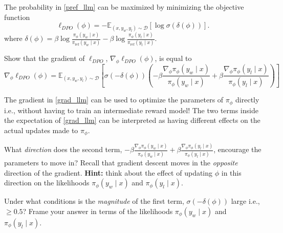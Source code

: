 \documentclass[11pt,addpoints,answers]{exam}
\begin{document}
\begin{questions}
\begin{parts}
\begin{subparts}
\clearpage
    \subpart[3] The probability in \eqref{pref_llm} can be maximized by minimizing the objective function
    \begin{equation}
        \ell_{DPO}(\phi) = -\mathbb{E}_{(x,y_w,y_l)\sim\mathcal{D}}\left[\log \sigma\left(\delta(\phi)\right) \right].
        \label{obj_llm}
    \end{equation}
    where $\delta(\phi) = \beta \log \frac{\pi_{\phi}(y_w \mid x)}{\pi_{\textrm{ref}}(y_w \mid x)} - \beta \log \frac{\pi_{\phi}(y_l \mid x)}{\pi_{\textrm{ref}}(y_l \mid x)}$. 

    Show that the gradient of $\ell_{DPO}$, $\nabla_{\phi} \ell_{DPO}(\phi)$, is equal to
    \begin{equation}
        \nabla_{\phi}\ell_{DPO}(\phi) = \mathbb{E}_{(x,y_w,y_l)\sim\mathcal{D}}\left[\sigma\left(-\delta(\phi)\right)\left(- \beta \frac{\nabla_{\phi}\pi_{\phi}(y_w \mid x)}{\pi_{\phi}(y_w \mid x)} + \beta  \frac{\nabla_{\phi}\pi_{\phi}(y_l \mid x)}{\pi_{\phi}(y_l \mid x)}\right) \right]
        \label{grad_llm}
    \end{equation}
    \begin{answer_box}[title=,height=12cm, width=14.5cm]
    \end{answer_box}

\clearpage
    \subpart The gradient in \eqref{grad_llm} can be used to optimize the parameters of $\pi_{\phi}$ directly i.e., without having to train an intermediate reward model! The two terms inside the expectation of \eqref{grad_llm} can be interpreted as having different effects on the actual updates made to $\pi_{\phi}$. 

    \begin{subsubparts}
        \subsubpart[2] What \emph{direction} does the second term, $- \beta \frac{\nabla_{\phi}\pi_{\phi}(y_w \mid x)}{\pi_{\phi}(y_w \mid x)} + \beta  \frac{\nabla_{\phi}\pi_{\phi}(y_l \mid x)}{\pi_{\phi}(y_l \mid x)}$, encourage the parameters to move in? Recall that gradient descent moves in the \emph{opposite} direction of the gradient. \textbf{Hint:} think about the effect of updating $\phi$ in this direction on the likelihoods $\pi_{\phi}(y_w \mid x)$ and $\pi_{\phi}(y_l \mid x)$.

        \begin{answer_box}[title=,height=6cm, width=14cm]
        \end{answer_box}
        
        \subsubpart[2] Under what conditions is the \emph{magnitude} of the first term, $\sigma(-\delta(\phi))$ large i.e., $\ge 0.5$? Frame your answer in terms of the likelihoods $\pi_{\phi}(y_w \mid x)$ and $\pi_{\phi}(y_l \mid x)$.
        

\end{subsubparts}
\end{subparts}
\end{parts}
\end{questions}
\end{document}
